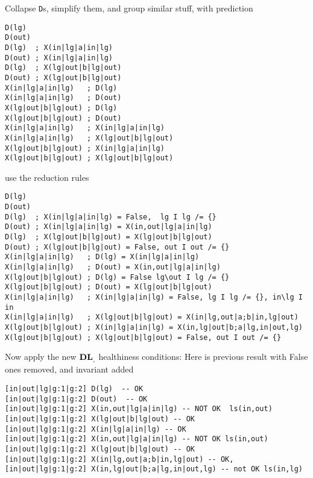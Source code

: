 Collapse \texttt{D}s, simplify them,
and group similar stuff, with prediction
{\footnotesize\begin{verbatim}
D(lg)
D(out)
D(lg)  ; X(in|lg|a|in|lg)
D(out) ; X(in|lg|a|in|lg)
D(lg)  ; X(lg|out|b|lg|out)
D(out) ; X(lg|out|b|lg|out)
X(in|lg|a|in|lg)   ; D(lg)
X(in|lg|a|in|lg)   ; D(out)
X(lg|out|b|lg|out) ; D(lg)
X(lg|out|b|lg|out) ; D(out)
X(in|lg|a|in|lg)   ; X(in|lg|a|in|lg)
X(in|lg|a|in|lg)   ; X(lg|out|b|lg|out)
X(lg|out|b|lg|out) ; X(in|lg|a|in|lg)
X(lg|out|b|lg|out) ; X(lg|out|b|lg|out)
\end{verbatim}}
use the reduction rules
{\footnotesize\begin{verbatim}
D(lg)
D(out)
D(lg)  ; X(in|lg|a|in|lg) = False,  lg I lg /= {}
D(out) ; X(in|lg|a|in|lg) = X(in,out|lg|a|in|lg)
D(lg)  ; X(lg|out|b|lg|out) = X(lg|out|b|lg|out)
D(out) ; X(lg|out|b|lg|out) = False, out I out /= {}
X(in|lg|a|in|lg)   ; D(lg) = X(in|lg|a|in|lg)
X(in|lg|a|in|lg)   ; D(out) = X(in,out|lg|a|in|lg)
X(lg|out|b|lg|out) ; D(lg) = False lg\out I lg /= {}
X(lg|out|b|lg|out) ; D(out) = X(lg|out|b|lg|out)
X(in|lg|a|in|lg)   ; X(in|lg|a|in|lg) = False, lg I lg /= {}, in\lg I in
X(in|lg|a|in|lg)   ; X(lg|out|b|lg|out) = X(in|lg,out|a;b|in,lg|out)
X(lg|out|b|lg|out) ; X(in|lg|a|in|lg) = X(in,lg|out|b;a|lg,in|out,lg)
X(lg|out|b|lg|out) ; X(lg|out|b|lg|out) = False, out I out /= {}
\end{verbatim}}
Now apply the new $\mathbf{DL}_{,}^{}$ healthiness conditions:
Here is previous result with False ones removed, and invariant added
{\footnotesize\begin{verbatim}
[in|out|lg|g:1|g:2] D(lg)  -- OK
[in|out|lg|g:1|g:2] D(out)  -- OK
[in|out|lg|g:1|g:2] X(in,out|lg|a|in|lg) -- NOT OK  ls(in,out)
[in|out|lg|g:1|g:2] X(lg|out|b|lg|out) -- OK
[in|out|lg|g:1|g:2] X(in|lg|a|in|lg) -- OK
[in|out|lg|g:1|g:2] X(in,out|lg|a|in|lg) -- NOT OK ls(in,out)
[in|out|lg|g:1|g:2] X(lg|out|b|lg|out) -- OK
[in|out|lg|g:1|g:2] X(in|lg,out|a;b|in,lg|out) -- OK,
[in|out|lg|g:1|g:2] X(in,lg|out|b;a|lg,in|out,lg) -- not OK ls(in,lg)
\end{verbatim}}
